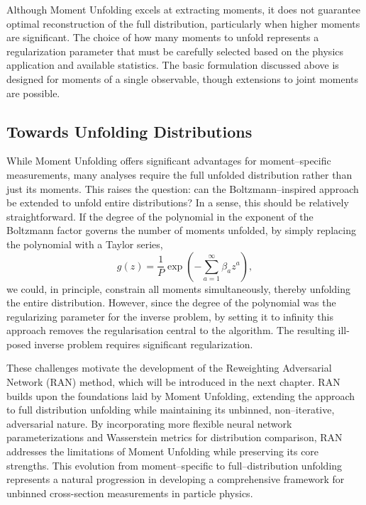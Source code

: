     Although Moment Unfolding excels at extracting moments, it does not guarantee optimal reconstruction of the full distribution, particularly when higher moments are significant.
    The choice of how many moments to unfold represents a regularization parameter that must be carefully selected based on the physics application and available statistics.
    The basic formulation discussed above is designed for moments of a single observable, though extensions to joint moments are possible.
    \subsection{Towards Unfolding Distributions}
        While Moment Unfolding offers significant advantages for moment--specific measurements, many analyses require the full unfolded distribution rather than just its moments.
        This raises the question: can the Boltzmann--inspired approach be extended to unfold entire distributions?
        In a sense, this should be relatively straightforward.
        If the degree of the polynomial in the exponent of the Boltzmann factor governs the number of moments unfolded, by simply replacing the polynomial with a Taylor series,
        \[
            g(z) = \frac{1}{P}\exp\left(-\sum_{a=1}^{\infty}\beta_a z^a\right),
        \]
        we could, in principle, constrain all moments simultaneously, thereby unfolding the entire distribution.
        However, since the degree of the polynomial was the regularizing parameter for the inverse problem, by setting it to infinity this approach removes the regularisation central to the algorithm.
        The resulting ill-posed inverse problem requires significant regularization.

        These challenges motivate the development of the Reweighting Adversarial Network (RAN) method, which will be introduced in the next chapter.
        RAN builds upon the foundations laid by Moment Unfolding, extending the approach to full distribution unfolding while maintaining its unbinned, non--iterative, adversarial nature.
        By incorporating more flexible neural network parameterizations and Wasserstein metrics for distribution comparison, RAN addresses the limitations of Moment Unfolding while preserving its core strengths.
        This evolution from moment--specific to full--distribution unfolding represents a natural progression in developing a comprehensive framework for unbinned cross-section measurements in particle physics.